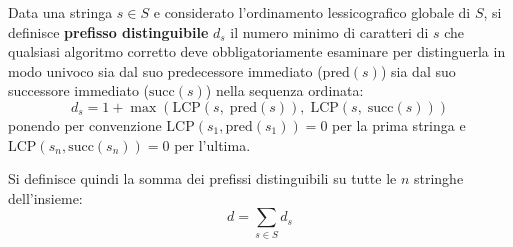 \begin{definition}
Data una stringa $s \in S$ e considerato l'ordinamento lessicografico globale di $S$, si definisce \textbf{prefisso distinguibile} $d_s$ il numero minimo di caratteri di $s$ che qualsiasi algoritmo corretto deve obbligatoriamente esaminare per distinguerla in modo univoco sia dal suo predecessore immediato ($\text{pred}(s)$) sia dal suo successore immediato ($\text{succ}(s)$) nella sequenza ordinata:
\begin{equation}
  d_s = 1 + \max \left( \text{LCP}(s, \; \text{pred}(s)), \; \text{LCP}(s, \; \text{succ}(s)) \right)
\end{equation}
ponendo per convenzione $\text{LCP}(s_1, \text{pred}(s_1)) = 0$ per la prima stringa e $\text{LCP}(s_n, \text{succ}(s_n)) = 0$ per l'ultima.
\end{definition}

Si definisce quindi la somma dei prefissi distinguibili su tutte le $n$ stringhe dell'insieme:
\begin{equation}
  d = \sum_{s \in S} d_s
\end{equation}

